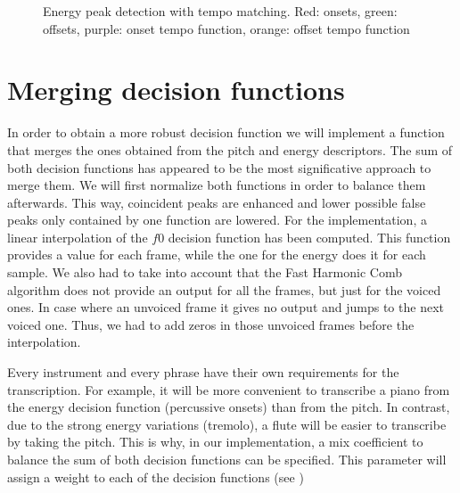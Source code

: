 \documentclass{article}
\begin{document}
\begin{figure}
 \centerline{}
 \caption{Energy peak detection with tempo matching. Red: onsets, green: offsets, purple: onset tempo function, orange: offset tempo function}
 \label{fig:energy_bpm}
\end{figure}

\section{Merging decision functions}

In order to obtain a more robust decision function we will implement a function that merges the ones obtained from the pitch and energy descriptors. The sum of both decision functions has appeared to be the most significative approach to merge them. We will first normalize both functions in order to balance them afterwards. This way, coincident peaks are enhanced and lower possible false peaks only contained by one function are lowered. 
For the implementation, a linear interpolation of the ${f0}$ decision function has been computed. This function provides a value for each frame, while the one for the energy does it for each sample. We also had to take into account that the Fast Harmonic Comb algorithm does not provide an output for all the frames, but just for the voiced ones. In case where an unvoiced frame it gives no output and jumps to the next voiced one. Thus, we had to add zeros in those unvoiced frames before the interpolation.

Every instrument and every phrase have their own requirements for the transcription. For example, it will be more convenient to transcribe a piano from the energy decision function (percussive onsets) than from the pitch. In contrast, due to the strong energy variations (tremolo), a flute will be easier to transcribe by taking the pitch. This is why, in our implementation, a mix coefficient to balance the sum of both decision functions can be specified. This parameter will assign a weight to each of the decision functions (see )
\end{document}
